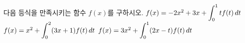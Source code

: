다음 등식을 만족시키는 함수 $f(x)$를 구하시오.
 $f(x)=-2x^2+3x+\displaystyle\int_{0}^{1}tf(t)\mkern3mu dt$
 $f(x)=x^2+\displaystyle\int_{0}^{2}(3x+1)f(t)\mkern3mu dt$
 $f(x)=3x^2+\displaystyle\int_{0}^{1}(2x-t)f(t)\mkern3mu dt$
